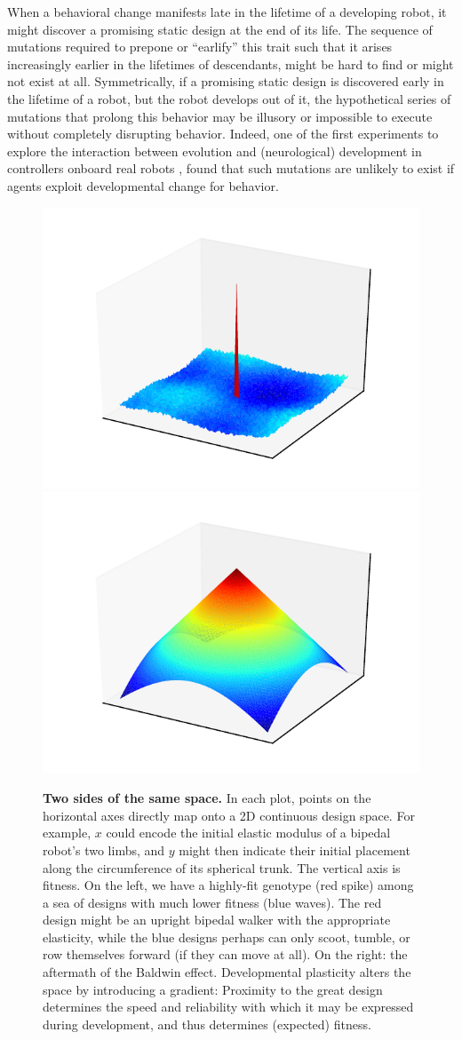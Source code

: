 When a behavioral change manifests late in the lifetime of a developing robot, it might discover a promising static design at the end of its life.
The sequence of mutations required to prepone or ``earlify'' this trait such that it arises increasingly earlier in the lifetimes of descendants, might be hard to find or might not exist at all.
Symmetrically, if a promising static design is discovered early in the lifetime of a robot, but the robot develops out of it, the hypothetical series of mutations that prolong this behavior may be 
illusory or impossible to execute without completely disrupting behavior.
Indeed, one of the first experiments to explore the interaction between evolution and (neurological) development in controllers onboard real robots \cite{floreano1996plastic}, found that such mutations are unlikely to exist if agents exploit developmental change for behavior.

\begin{figure}
\centering
\includegraphics[trim={40pt 20pt 30pt 25pt},clip,width=0.49\linewidth]{fig/baldwin_rugged.pdf}
\includegraphics[trim={40pt 20pt 30pt 25pt},clip,width=0.49\linewidth]{fig/baldwin_smooth.pdf}
\caption{\label{fig:baldwin3d}\textbf{Two sides of the same space.} 
In each plot, points on the horizontal axes directly map onto a 2D continuous design space.
For example, $x$ could encode the initial elastic modulus of a bipedal robot's two limbs, and $y$ might then indicate their initial placement along the circumference of its spherical trunk.
The vertical axis is fitness.
On the left, we have a highly-fit genotype (red spike) among a sea of designs with much lower fitness (blue waves).
The red design might be an upright bipedal walker with the appropriate elasticity,
while the blue designs perhaps can only scoot, tumble, or row themselves forward (if they can move at all).
On the right: the aftermath of the Baldwin effect.
Developmental plasticity alters the space by introducing a gradient: 
Proximity to the great design determines the speed and reliability with which it may be expressed during development, and thus determines (expected) fitness.
}
\end{figure}

